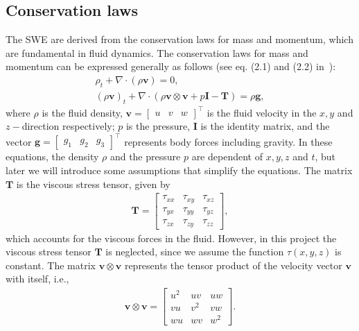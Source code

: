 \subsection{Conservation laws}
The SWE are derived from the conservation laws for mass and momentum, which are fundamental in fluid dynamics.
The conservation laws for mass and momentum can be expressed generally as follows (see eq. (2.1) and (2.2) in~\cite{Toro2001-Shock}):
\begin{align}
    \rho_t + \nabla \cdot (\rho \mathbf{v}) = 0, \label{eq:mass_conservation} \\
    {(\rho \mathbf{v})}_t + \nabla \cdot (\rho \mathbf{v} \otimes \mathbf{v} + p \mathbf{I} - \mathbf{T}) = \rho \mathbf{g}, \label{eq:momentum_conservation}
\end{align}
where $\rho$ is the fluid density, $\mathbf{v} = \begin{bmatrix} u & v & w \end{bmatrix}^\top$ is the fluid velocity in the $x, y$ and $z-$direction respectively;
$p$ is the pressure, $\mathbf{I}$ is the identity matrix, and the vector $\mathbf{g} = \begin{bmatrix}
    g_1 & g_2 & g_3
\end{bmatrix}^\top$ represents body forces including gravity.
In these equations, the density $\rho$ and the pressure $p$ are dependent of $x, y, z$ and $t$, but later we will introduce some assumptions that simplify the equations.
The matrix $\mathbf{T}$ is the viscous stress tensor, given by
\begin{align*}
    \mathbf{T} = \begin{bmatrix}
        \tau_{xx} & \tau_{xy} & \tau_{xz} \\
        \tau_{yx} & \tau_{yy} & \tau_{yz} \\
        \tau_{zx} & \tau_{zy} & \tau_{zz}
    \end{bmatrix},
\end{align*}
which accounts for the viscous forces in the fluid.
However, in this project the viscous stress tensor $\mathbf{T}$ is neglected, since we assume the function $\tau(x,y,z)$ is constant.
The matrix $\mathbf{v} \otimes \mathbf{v}$ represents the tensor product of the velocity vector $\mathbf{v}$ with itself, i.e.,
\begin{align*}
    \mathbf{v} \otimes \mathbf{v} = \begin{bmatrix}
        u^2 & uv & uw \\
        vu & v^2 & vw \\
        wu & wv & w^2
    \end{bmatrix}.
\end{align*}
